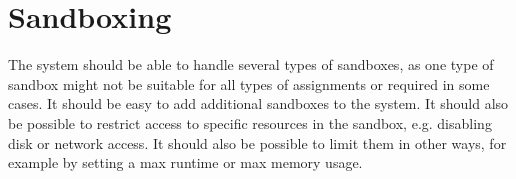 \section{Sandboxing}
The system should be able to handle several types of sandboxes, as one type of sandbox
might not be suitable for all types of assignments or required in some cases. It should
be easy to add additional sandboxes to the system. It should also be possible to restrict access to
specific resources in the sandbox, e.g. disabling disk or network access.
It should also be possible to limit them in other ways, for example by setting
a max runtime or max memory usage.
